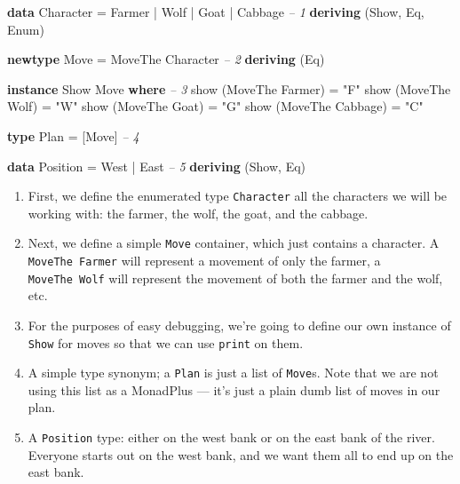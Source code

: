 \documentclass[]{article}
\newenvironment{Shaded}{}{}
\newcommand{\CommentTok}[1]{\textcolor[rgb]{0.38,0.63,0.69}{\textit{#1}}}
\newcommand{\DataTypeTok}[1]{\textcolor[rgb]{0.56,0.13,0.00}{#1}}
\newcommand{\FunctionTok}[1]{\textcolor[rgb]{0.02,0.16,0.49}{#1}}
\newcommand{\KeywordTok}[1]{\textcolor[rgb]{0.00,0.44,0.13}{\textbf{#1}}}
\newcommand{\NormalTok}[1]{#1}
\newcommand{\StringTok}[1]{\textcolor[rgb]{0.25,0.44,0.63}{#1}}
\begin{document}
\begin{Shaded}
\begin{Highlighting}[]
\KeywordTok{data} \DataTypeTok{Character} \FunctionTok{=} \DataTypeTok{Farmer} \FunctionTok{|} \DataTypeTok{Wolf} \FunctionTok{|} \DataTypeTok{Goat} \FunctionTok{|} \DataTypeTok{Cabbage} \CommentTok{-- 1}
        \KeywordTok{deriving}\NormalTok{ (}\DataTypeTok{Show}\NormalTok{, }\DataTypeTok{Eq}\NormalTok{, }\DataTypeTok{Enum}\NormalTok{)}

\KeywordTok{newtype} \DataTypeTok{Move} \FunctionTok{=} \DataTypeTok{MoveThe} \DataTypeTok{Character}                \CommentTok{-- 2}
        \KeywordTok{deriving}\NormalTok{ (}\DataTypeTok{Eq}\NormalTok{)}

\KeywordTok{instance} \DataTypeTok{Show} \DataTypeTok{Move} \KeywordTok{where}                        \CommentTok{-- 3}
\NormalTok{    show (}\DataTypeTok{MoveThe} \DataTypeTok{Farmer}\NormalTok{)  }\FunctionTok{=} \StringTok{"F"}
\NormalTok{    show (}\DataTypeTok{MoveThe} \DataTypeTok{Wolf}\NormalTok{)    }\FunctionTok{=} \StringTok{"W"}
\NormalTok{    show (}\DataTypeTok{MoveThe} \DataTypeTok{Goat}\NormalTok{)    }\FunctionTok{=} \StringTok{"G"}
\NormalTok{    show (}\DataTypeTok{MoveThe} \DataTypeTok{Cabbage}\NormalTok{) }\FunctionTok{=} \StringTok{"C"}

\KeywordTok{type} \DataTypeTok{Plan} \FunctionTok{=}\NormalTok{ [}\DataTypeTok{Move}\NormalTok{]                              }\CommentTok{-- 4}

\KeywordTok{data} \DataTypeTok{Position} \FunctionTok{=} \DataTypeTok{West} \FunctionTok{|} \DataTypeTok{East}                     \CommentTok{-- 5}
    \KeywordTok{deriving}\NormalTok{ (}\DataTypeTok{Show}\NormalTok{, }\DataTypeTok{Eq}\NormalTok{)}
\end{Highlighting}
\end{Shaded}

\begin{enumerate}
\def\labelenumi{\arabic{enumi}.}
\tightlist
\item
  First, we define the enumerated type \texttt{Character} all the characters we
  will be working with: the farmer, the wolf, the goat, and the cabbage.
\item
  Next, we define a simple \texttt{Move} container, which just contains a
  character. A \texttt{MoveThe\ Farmer} will represent a movement of only the
  farmer, a \texttt{MoveThe\ Wolf} will represent the movement of both the
  farmer and the wolf, etc.
\item
  For the purposes of easy debugging, we're going to define our own instance of
  \texttt{Show} for moves so that we can use \texttt{print} on them.
\item
  A simple type synonym; a \texttt{Plan} is just a list of \texttt{Move}s. Note
  that we are not using this list as a MonadPlus --- it's just a plain dumb list
  of moves in our plan.
\item
  A \texttt{Position} type: either on the west bank or on the east bank of the
  river. Everyone starts out on the west bank, and we want them all to end up on
  the east bank.
\end{enumerate}
\end{document}
